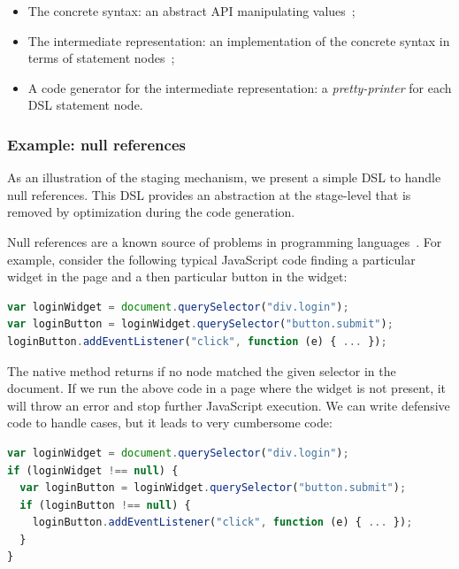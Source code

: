 \documentclass[runningheads,a4paper]{llncs}
\begin{document}
\begin{itemize}
\item The concrete syntax: an abstract API manipulating  values~;
\item The intermediate representation: an implementation of the concrete syntax in terms of statement nodes~;
\item A code generator for the intermediate representation: a \emph{pretty-printer} for each DSL statement node.
\end{itemize}

\subsubsection{Example: null references}

As an illustration of the staging mechanism, we present a simple DSL to handle null references. This DSL provides an
abstraction at the stage-level that is removed by optimization during the code generation.

Null references are a known source of problems in programming languages~\cite{Hoare09_Null,Nanda09_Null}. For
example, consider the following typical JavaScript code finding a particular widget in the page and a then particular
button in the widget:

\begin{lstlisting}[language=JavaScript,label=null-unsafe,caption=Unsafe code]
var loginWidget = document.querySelector("div.login");
var loginButton = loginWidget.querySelector("button.submit");
loginButton.addEventListener("click", function (e) { ... });
\end{lstlisting}

The native  method returns  if no node matched the given selector in the document. If
we run the above code in a page where the widget is not present, it will throw an error and stop further JavaScript
execution. We can write defensive code to handle  cases, but it leads to very cumbersome code:

\begin{lstlisting}[language=JavaScript,label=null-defensive,caption=Defensive programming to handle null references]
var loginWidget = document.querySelector("div.login");
if (loginWidget !== null) {
  var loginButton = loginWidget.querySelector("button.submit");
  if (loginButton !== null) {
    loginButton.addEventListener("click", function (e) { ... });
  }
}
\end{lstlisting}
\end{document}
